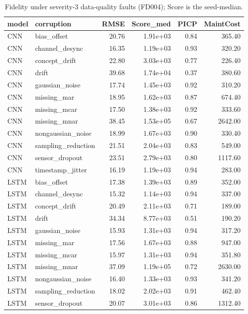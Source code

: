 \begin{table}
\caption{Fidelity under severity-3 data-quality faults (FD004); Score is the seed-median.}
\label{tab:sev3_FD004}
\begin{tabular}{llrrrr}
\toprule  %
model & corruption & RMSE & Score\_med & PICP & MaintCost \\
\midrule
CNN & bias\_offset & 20.76 & 1.91e+03 & 0.84 & 365.40 \\
CNN & channel\_desync & 16.35 & 1.19e+03 & 0.93 & 320.20 \\
CNN & concept\_drift & 22.80 & 3.03e+03 & 0.77 & 226.40 \\
CNN & drift & 39.68 & 1.74e+04 & 0.37 & 380.60 \\
CNN & gaussian\_noise & 17.74 & 1.45e+03 & 0.92 & 310.20 \\
CNN & missing\_mar & 18.95 & 1.62e+03 & 0.87 & 674.40 \\
CNN & missing\_mcar & 17.50 & 1.38e+03 & 0.92 & 333.60 \\
CNN & missing\_mnar & 38.45 & 1.53e+05 & 0.67 & 2642.00 \\
CNN & nongaussian\_noise & 18.99 & 1.67e+03 & 0.90 & 330.40 \\
CNN & sampling\_reduction & 21.51 & 2.04e+03 & 0.83 & 549.00 \\
CNN & sensor\_dropout & 23.51 & 2.79e+03 & 0.80 & 1117.60 \\
CNN & timestamp\_jitter & 16.19 & 1.19e+03 & 0.94 & 283.00 \\
LSTM & bias\_offset & 17.38 & 1.39e+03 & 0.89 & 352.00 \\
LSTM & channel\_desync & 15.32 & 1.14e+03 & 0.94 & 337.00 \\
LSTM & concept\_drift & 20.49 & 2.11e+03 & 0.71 & 189.00 \\
LSTM & drift & 34.34 & 8.77e+03 & 0.51 & 190.20 \\
LSTM & gaussian\_noise & 15.93 & 1.31e+03 & 0.94 & 317.20 \\
LSTM & missing\_mar & 17.56 & 1.67e+03 & 0.88 & 947.00 \\
LSTM & missing\_mcar & 15.97 & 1.31e+03 & 0.94 & 351.80 \\
LSTM & missing\_mnar & 37.09 & 1.19e+05 & 0.72 & 2630.00 \\
LSTM & nongaussian\_noise & 16.40 & 1.33e+03 & 0.93 & 341.20 \\
LSTM & sampling\_reduction & 18.02 & 2.02e+03 & 0.91 & 462.40 \\
LSTM & sensor\_dropout & 20.07 & 3.01e+03 & 0.86 & 1312.40 \\

\end{tabular}
\end{table}
